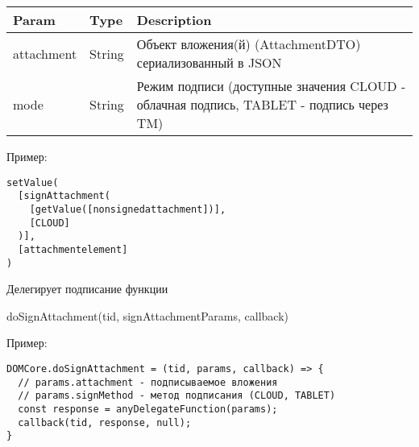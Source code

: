 \begin{longtable}[]{@{}lll@{}}
\toprule
\begin{minipage}[b]{0.30\columnwidth}\raggedright
Param\strut
\end{minipage} & \begin{minipage}[b]{0.30\columnwidth}\raggedright
Type\strut
\end{minipage} & \begin{minipage}[b]{0.30\columnwidth}\raggedright
Description\strut
\end{minipage}\tabularnewline
\midrule
\endhead
\begin{minipage}[t]{0.30\columnwidth}\raggedright
attachment\strut
\end{minipage} & \begin{minipage}[t]{0.30\columnwidth}\raggedright
String\strut
\end{minipage} & \begin{minipage}[t]{0.30\columnwidth}\raggedright
Объект вложения(й) (AttachmentDTO) сериализованный в JSON\strut
\end{minipage}\tabularnewline
\begin{minipage}[t]{0.30\columnwidth}\raggedright
mode\strut
\end{minipage} & \begin{minipage}[t]{0.30\columnwidth}\raggedright
String\strut
\end{minipage} & \begin{minipage}[t]{0.30\columnwidth}\raggedright
Режим подписи (доступные значения CLOUD - облачная подпись, TABLET -
подпись через TM)\strut
\end{minipage}\tabularnewline
\bottomrule
\end{longtable}

Пример:

\begin{verbatim}
setValue(
  [signAttachment(
    [getValue([nonsignedattachment])],
    [CLOUD]
  )],
  [attachmentelement]
)
\end{verbatim}

Делегирует подписание функции 

doSignAttachment(tid,
signAttachmentParams, callback) 

Пример:

\begin{verbatim}
DOMCore.doSignAttachment = (tid, params, callback) => {
  // params.attachment - подписываемое вложения
  // params.signMethod - метод подписания (CLOUD, TABLET)
  const response = anyDelegateFunction(params);
  callback(tid, response, null);
}
\end{verbatim}

